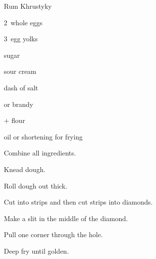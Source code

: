 \begin{recipe}{Rum Khrustyky}{}{}

\begin{ingredients}
\item 2~whole eggs
\item 3~egg yolks
\item {} sugar
\item {} sour cream
\item dash of salt
\item {}  or brandy
\item {}$+$ flour
\item oil or shortening for frying
\end{ingredients}

\begin{directions}
\item Combine all ingredients.
\item Knead dough.
\item Roll dough out \inch{\eighth} thick.
\item Cut into strips and then cut strips into diamonds.
\item Make a slit in the middle of the diamond.
\item Pull one corner through the hole.
\item Deep fry until golden.
\end{directions}

\end{recipe}
